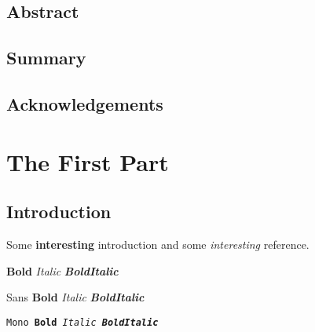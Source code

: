 \documentclass[english]{his-thesis}
\begin{document}

\maketitle

\cleardoublepage
{}%
\setcounter{page}{1}%
\pagestyle{headings}

\chapter*{Abstract}

\lipsum[1]


\chapter*{Summary}

\lipsum[2-4]


\chapter*{Acknowledgements}

\lipsum[5]


\tableofcontents

\listoffigures

\listoftables

\cleardoublepage
{}%
\setcounter{page}{1}%
\pagestyle{headings}

\part{The First Part}

\chapter{Introduction}
\label{chap_introduction}

Some \textbf{interesting} \textsf{introduction} and some \emph{interesting} reference.
\par\textbf{Bold} \textit{Italic} \textbf{\textit{BoldItalic}}
\par\textsf{Sans \textbf{Bold} \textit{Italic} \textbf{\textit{BoldItalic}}}
\par\texttt{Mono \textbf{Bold} \textit{Italic} \textbf{\textit{BoldItalic}}}
\end{document}
